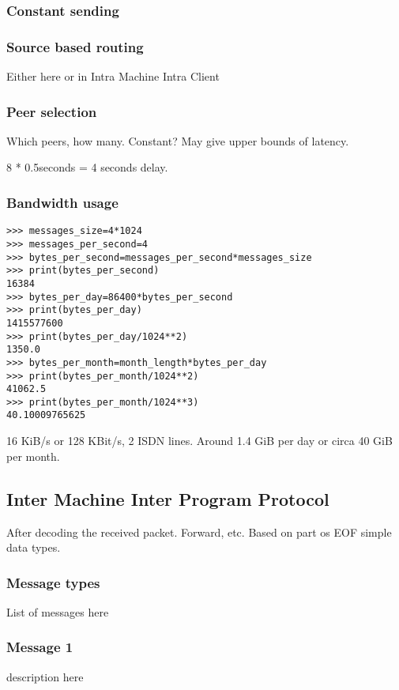 \subsubsection{Constant sending}

\subsubsection{Source based routing}
Either here or in Intra Machine Intra Client
\subsubsection{Peer selection}
Which peers, how many. Constant? May give upper bounds of latency.

8 * 0.5seconds = 4 seconds delay.

\subsubsection{Bandwidth usage}
\begin{verbatim}
>>> messages_size=4*1024
>>> messages_per_second=4
>>> bytes_per_second=messages_per_second*messages_size
>>> print(bytes_per_second)
16384
>>> bytes_per_day=86400*bytes_per_second
>>> print(bytes_per_day)
1415577600
>>> print(bytes_per_day/1024**2)
1350.0
>>> bytes_per_month=month_length*bytes_per_day
>>> print(bytes_per_month/1024**2)
41062.5
>>> print(bytes_per_month/1024**3)
40.10009765625
\end{verbatim}
16 KiB/s or 128 KBit/s, 2 ISDN lines. Around 1.4 GiB per day or
circa 40 GiB per month.

\subsection{Inter Machine Inter Program Protocol}
After decoding the received packet. Forward, etc.
Based on part os EOF simple data types.
\subsubsection{Message types}
List of messages here
\subsubsection{Message 1}
description here


